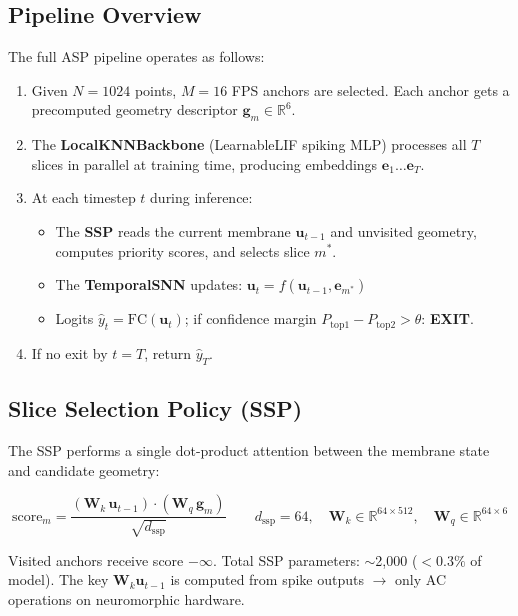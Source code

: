 \documentclass[11pt,a4paper]{article}
\begin{document}
\subsection{Pipeline Overview}

The full ASP pipeline operates as follows:

\begin{enumerate}
  \item Given $N=1024$ points, $M=16$ FPS anchors are selected. Each anchor gets a
        precomputed geometry descriptor $\mathbf{g}_m \in \mathbb{R}^6$.
  \item The \textbf{LocalKNNBackbone} (LearnableLIF spiking MLP) processes all $T$ slices
        in parallel at training time, producing embeddings $\mathbf{e}_1 \ldots \mathbf{e}_T$.
  \item At each timestep $t$ during inference:
        \begin{itemize}
          \item The \textbf{SSP} reads the current membrane $\mathbf{u}_{t-1}$ and unvisited geometry,
                computes priority scores, and selects slice $m^*$.
          \item The \textbf{TemporalSNN} updates: $\mathbf{u}_t = f(\mathbf{u}_{t-1}, \mathbf{e}_{m^*})$
          \item Logits $\hat{y}_t = \text{FC}(\mathbf{u}_t)$; if confidence margin
                $P_{\text{top1}} - P_{\text{top2}} > \theta$: \textbf{EXIT}.
        \end{itemize}
  \item If no exit by $t = T$, return $\hat{y}_T$.
\end{enumerate}

\subsection{Slice Selection Policy (SSP)}

The SSP performs a single dot-product attention between the membrane state and candidate geometry:

\[
  \text{score}_m = \frac{(\mathbf{W}_k\,\mathbf{u}_{t-1})\cdot(\mathbf{W}_q\,\mathbf{g}_m)}{\sqrt{d_{\text{ssp}}}}
  \qquad d_{\text{ssp}} = 64,\quad \mathbf{W}_k \in \mathbb{R}^{64\times 512},\quad \mathbf{W}_q \in \mathbb{R}^{64\times 6}
\]

Visited anchors receive score $-\infty$. Total SSP parameters: $\sim$2{,}000 ($< 0.3\%$ of model).
The key $\mathbf{W}_k\mathbf{u}_{t-1}$ is computed from spike outputs $\to$ only AC operations
on neuromorphic hardware.
\end{document}
